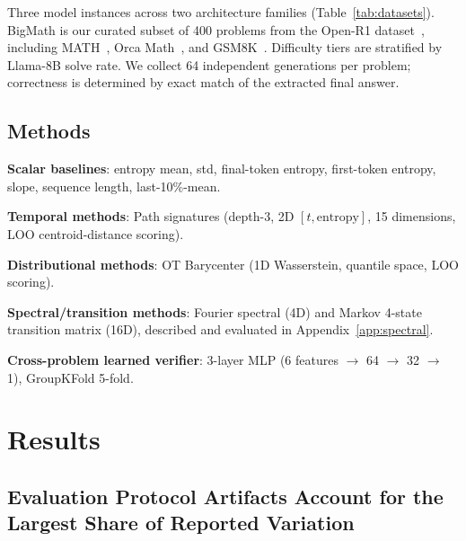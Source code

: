 \documentclass{article}
\begin{document}
Three model instances across two architecture families (Table~\ref{tab:datasets}). BigMath is our curated subset of 400 problems from the Open-R1 dataset~\cite{openr1bigmath}, including MATH~\cite{hendrycks2021measuring}, Orca Math~\cite{mukherjee2023orca}, and GSM8K~\cite{cobbe2021gsm8k}. Difficulty tiers are stratified by Llama-8B solve rate. We collect 64 independent generations per problem; correctness is determined by exact match of the extracted final answer.

\subsection{Methods}

\textbf{Scalar baselines}: entropy mean, std, final-token entropy, first-token entropy, slope, sequence length, last-10\%-mean.

\textbf{Temporal methods}: Path signatures (depth-3, 2D $[t, \text{entropy}]$, 15 dimensions, LOO centroid-distance scoring).

\textbf{Distributional methods}: OT Barycenter (1D Wasserstein, quantile space, LOO scoring).

\textbf{Spectral/transition methods}: Fourier spectral (4D) and Markov 4-state transition matrix (16D), described and evaluated in Appendix~\ref{app:spectral}.

\textbf{Cross-problem learned verifier}: 3-layer MLP (6 features $\to$ 64 $\to$ 32 $\to$ 1), GroupKFold 5-fold.

\section{Results}
\label{sec:results}

\subsection{Evaluation Protocol Artifacts Account for the Largest Share of Reported Variation}
\label{sec:protocol}

\begin{table}[t]
\centering
\caption{Effect of evaluation protocol on hard-problem AUROC. Negative $\Delta$ indicates degradation relative to LOO.}
\label{tab:protocol}
\end{table}
\end{document}
